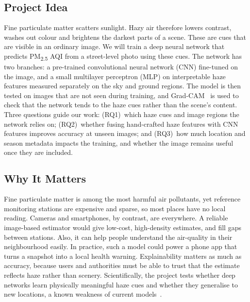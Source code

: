 \documentclass[conference]{IEEEtran}
\newcommand{\pmtwofive}{PM\textsubscript{2.5}}
\begin{document}
\subsection{Project Idea}
Fine particulate matter scatters sunlight. Hazy air therefore lowers contrast, washes out colour and brightens the darkest parts of a scene. These are cues that are visible in an ordinary image. We will train a deep neural network that predicts \pmtwofive{} AQI from a street-level photo using these cues. The network has two branches: a pre-trained convolutional neural network (CNN) fine-tuned on the image, and a small multilayer perceptron (MLP) on interpretable haze features measured separately on the sky and ground regions. The model is then tested on images that are not seen during training, and Grad-CAM~\cite{selvaraju2017} is used to check that the network tends to the haze cues rather than the scene's content. Three questions guide our work: (RQ1)~which haze cues and image regions the network relies on; (RQ2)~whether fusing hand-crafted haze features with CNN features improves accuracy at unseen images; and (RQ3)~how much location and season metadata impacts the training, and whether the image remains useful once they are included.

\subsection{Why It Matters}
Fine particulate matter is among the most harmful air pollutants, yet reference monitoring stations are expensive and sparse, so most places have no local reading. Cameras and smartphones, by contrast, are everywhere. A reliable image-based estimator would give low-cost, high-density estimates, and fill gaps between stations. Also, it can help people understand the air-quality in their neighbourhood easily. In practice, such a model could power a phone app that turns a snapshot into a local health warning. Explainability matters as much as accuracy, because users and authorities must be able to trust that the estimate reflects haze rather than scenery. Scientifically, the project tests whether deep networks learn physically meaningful haze cues and whether they generalise to new locations, a known weakness of current models~\cite{byler2025}.
\end{document}
